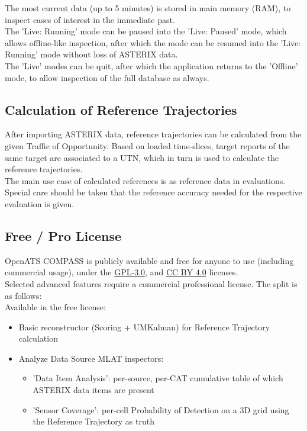 The most current data (up to 5 minutes) is stored in main memory (RAM), to inspect cases of interest in the immediate past. \\

The 'Live: Running' mode can be paused into the 'Live: Paused' mode, which allows offline-like inspection, after which the mode can be resumed into the 'Live: Running' mode without loss of ASTERIX data. \\

The 'Live' modes can be quit, after which the application returns to the 'Offline' mode, to allow inspection of the full database as always.

\subsection*{Calculation of Reference Trajectories}

After importing ASTERIX data, reference trajectories can be calculated from the given Traffic of Opportunity. Based on loaded time-slices, target reports of the same target are associated to a UTN, which in turn is used to calculate the reference trajectories. \\

The main use case of calculated references is as reference data in evaluations. Special care should be taken that the reference accuracy needed for the respective evaluation is given. \\

\subsection*{Free / Pro License}

OpenATS COMPASS is publicly available and free for anyone to use (including commercial usage), under the \href{https://www.gnu.org/licenses/gpl-3.0.en.html}{GPL-3.0}, and \href{https://creativecommons.org/licenses/by/4.0/}{CC BY 4.0} licenses. \\

Selected advanced features require a commercial professional license. The split is as follows: \\

Available in the free license:
\begin{itemize}
\item Basic reconstructor (Scoring + UMKalman) for Reference Trajectory calculation
\item Analyze Data Source MLAT inspectors:
\begin{itemize}
\item 'Data Item Analysis': per-source, per-CAT cumulative table of which ASTERIX data items are present
\item 'Sensor Coverage': per-cell Probability of Detection on a 3D grid using the Reference Trajectory as truth
\end{itemize}
\end{itemize}
\ \\

